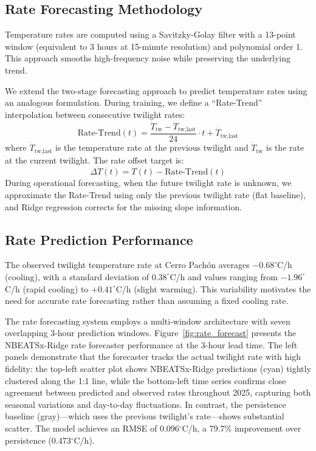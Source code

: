 \documentclass[twocolumn]{aastex631}
\begin{document}
\subsection{Rate Forecasting Methodology}

Temperature rates are computed using a Savitzky-Golay filter with a 13-point window (equivalent to 3 hours at 15-minute resolution) and polynomial order 1. This approach smooths high-frequency noise while preserving the underlying trend.

We extend the two-stage forecasting approach to predict temperature rates using an analogous formulation. During training, we define a ``Rate-Trend'' interpolation between consecutive twilight rates:
\begin{equation}
\text{Rate-Trend}(t) = \frac{\dot{T}_{\text{tw}} - \dot{T}_{\text{tw,last}}}{24} \cdot t + \dot{T}_{\text{tw,last}}
\end{equation}
where $\dot{T}_{\text{tw,last}}$ is the temperature rate at the previous twilight and $\dot{T}_{\text{tw}}$ is the rate at the current twilight. The rate offset target is:
\begin{equation}
\Delta\dot{T}(t) = \dot{T}(t) - \text{Rate-Trend}(t)
\end{equation}
During operational forecasting, when the future twilight rate is unknown, we approximate the Rate-Trend using only the previous twilight rate (flat baseline), and Ridge regression corrects for the missing slope information.

\subsection{Rate Prediction Performance}

The observed twilight temperature rate at Cerro Pach\'on averages $-0.68^\circ$C/h (cooling), with a standard deviation of $0.38^\circ$C/h and values ranging from $-1.96^\circ$C/h (rapid cooling) to $+0.41^\circ$C/h (slight warming). This variability motivates the need for accurate rate forecasting rather than assuming a fixed cooling rate.

The rate forecasting system employs a multi-window architecture with seven overlapping 3-hour prediction windows. Figure~\ref{fig:rate_forecast} presents the NBEATSx-Ridge rate forecaster performance at the 3-hour lead time. The left panels demonstrate that the forecaster tracks the actual twilight rate with high fidelity: the top-left scatter plot shows NBEATSx-Ridge predictions (cyan) tightly clustered along the 1:1 line, while the bottom-left time series confirms close agreement between predicted and observed rates throughout 2025, capturing both seasonal variations and day-to-day fluctuations. In contrast, the persistence baseline (gray)---which uses the previous twilight's rate---shows substantial scatter. The model achieves an RMSE of 0.096$^\circ$C/h, a 79.7\% improvement over persistence (0.473$^\circ$C/h).
\end{document}
